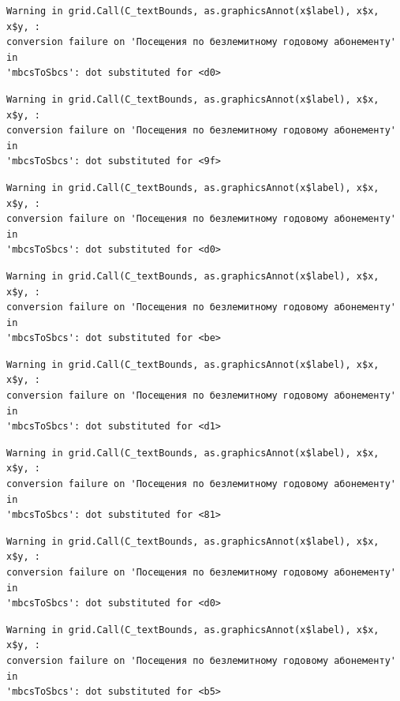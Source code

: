 \documentclass[
  letterpaper,
  DIV=11,
  numbers=noendperiod]{scrartcl}
\begin{document}
\begin{verbatim}
Warning in grid.Call(C_textBounds, as.graphicsAnnot(x$label), x$x, x$y, :
conversion failure on 'Посещения по безлемитному годовому абонементу' in
'mbcsToSbcs': dot substituted for <d0>
\end{verbatim}

\begin{verbatim}
Warning in grid.Call(C_textBounds, as.graphicsAnnot(x$label), x$x, x$y, :
conversion failure on 'Посещения по безлемитному годовому абонементу' in
'mbcsToSbcs': dot substituted for <9f>
\end{verbatim}

\begin{verbatim}
Warning in grid.Call(C_textBounds, as.graphicsAnnot(x$label), x$x, x$y, :
conversion failure on 'Посещения по безлемитному годовому абонементу' in
'mbcsToSbcs': dot substituted for <d0>
\end{verbatim}

\begin{verbatim}
Warning in grid.Call(C_textBounds, as.graphicsAnnot(x$label), x$x, x$y, :
conversion failure on 'Посещения по безлемитному годовому абонементу' in
'mbcsToSbcs': dot substituted for <be>
\end{verbatim}

\begin{verbatim}
Warning in grid.Call(C_textBounds, as.graphicsAnnot(x$label), x$x, x$y, :
conversion failure on 'Посещения по безлемитному годовому абонементу' in
'mbcsToSbcs': dot substituted for <d1>
\end{verbatim}

\begin{verbatim}
Warning in grid.Call(C_textBounds, as.graphicsAnnot(x$label), x$x, x$y, :
conversion failure on 'Посещения по безлемитному годовому абонементу' in
'mbcsToSbcs': dot substituted for <81>
\end{verbatim}

\begin{verbatim}
Warning in grid.Call(C_textBounds, as.graphicsAnnot(x$label), x$x, x$y, :
conversion failure on 'Посещения по безлемитному годовому абонементу' in
'mbcsToSbcs': dot substituted for <d0>
\end{verbatim}

\begin{verbatim}
Warning in grid.Call(C_textBounds, as.graphicsAnnot(x$label), x$x, x$y, :
conversion failure on 'Посещения по безлемитному годовому абонементу' in
'mbcsToSbcs': dot substituted for <b5>
\end{verbatim}
\end{document}
